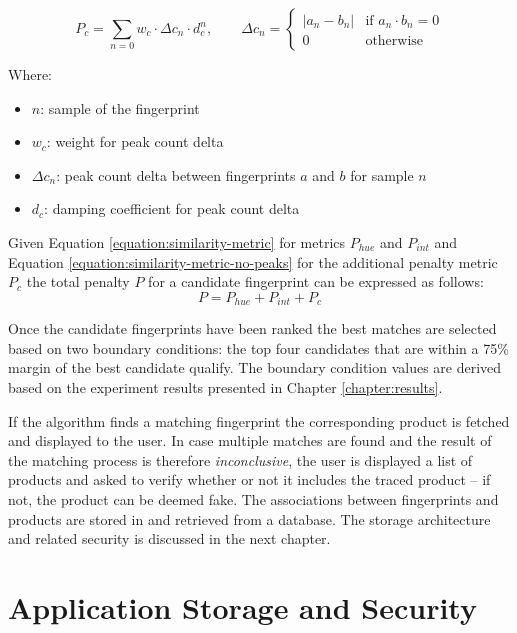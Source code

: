 \documentclass[thesis.tex]{subfiles}
\begin{document}
\vspace{-4mm}
\begin{equation}
\label{equation:similarity-metric-no-peaks}
P_c = \sum \limits_{n=0} { w_c \cdot \Delta{c_n} \cdot d_c^n }, \qquad
\Delta{c_n} = \begin{cases}
|a_n - b_n| &\text{if $a_n \cdot b_n = 0$}\\
0 &\text{otherwise}
\end{cases}
\end{equation}

Where:
\begin{itemize}[label=]
	\setlength\itemsep{0.10em}
    \item $n$: sample of the fingerprint
    \item $w_c$: weight for peak count delta
    \item $\Delta{c_n}$: peak count delta between fingerprints $a$ and $b$ for sample $n$
    \item $d_c$: damping coefficient for peak count delta
\end{itemize}
\enlargethispage{2\baselineskip}
\noindent Given Equation \ref{equation:similarity-metric} for metrics $P_{hue}$ and $P_{int}$ and Equation \ref{equation:similarity-metric-no-peaks} for the additional penalty metric $P_c$ the total penalty $P$ for a candidate fingerprint can be expressed as follows:
\begin{equation}
	P = P_{hue} + P_{int} + P_{c}
\end{equation}

Once the candidate fingerprints have been ranked the best matches are selected based on two boundary conditions: the top four candidates that are within a 75\% margin of the best candidate qualify. The boundary condition values are derived based on the experiment results presented in Chapter \ref{chapter:results}.

If the algorithm finds a matching fingerprint the corresponding product is fetched and displayed to the user. In case multiple matches are found and the result of the matching process is therefore \emph{inconclusive}, the user is displayed a list of products and asked to verify whether or not it includes the traced product -- if not, the product can be deemed fake. The associations between fingerprints and products are stored in and retrieved from a database. The storage architecture and related security is discussed in the next chapter.

\section{Application Storage and Security}
\label{chapter:storage-security}
\end{document}

